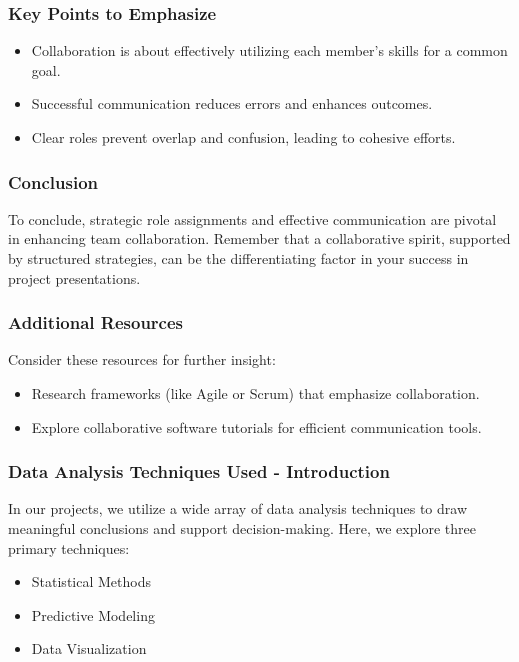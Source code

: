 \documentclass[aspectratio=169]{beamer}
\begin{document}
\begin{frame}[fragile]
    \frametitle{Key Points to Emphasize}
    \begin{itemize}
        \item Collaboration is about effectively utilizing each member's skills for a common goal.
        \item Successful communication reduces errors and enhances outcomes.
        \item Clear roles prevent overlap and confusion, leading to cohesive efforts.
    \end{itemize}
\end{frame}

\begin{frame}[fragile]
    \frametitle{Conclusion}
    To conclude, strategic role assignments and effective communication are pivotal in enhancing team collaboration. Remember that a collaborative spirit, supported by structured strategies, can be the differentiating factor in your success in project presentations.
\end{frame}

\begin{frame}[fragile]
    \frametitle{Additional Resources}
    Consider these resources for further insight:
    \begin{itemize}
        \item Research frameworks (like Agile or Scrum) that emphasize collaboration.
        \item Explore collaborative software tutorials for efficient communication tools.
    \end{itemize}
\end{frame}

\begin{frame}[fragile]
    \frametitle{Data Analysis Techniques Used - Introduction}
    In our projects, we utilize a wide array of data analysis techniques to draw meaningful conclusions and support decision-making. Here, we explore three primary techniques:
    \begin{itemize}
        \item Statistical Methods
        \item Predictive Modeling
        \item Data Visualization
    \end{itemize}
\end{frame}
\end{document}
